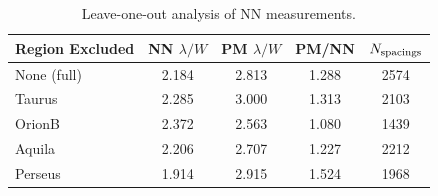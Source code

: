 \begin{table}[htbp]
\centering
\caption{Leave-one-out analysis of NN measurements.}
\label{tab:leave_one_out}
\begin{tabular}{lcccc}
\hline
Region Excluded & NN $\lambda/W$ & PM $\lambda/W$ & PM/NN & $N_{\rm spacings}$ \\
\hline
None (full) & 2.184 & 2.813 & 1.288 & 2574 \\
\hline
Taurus & 2.285 & 3.000 & 1.313 & 2103 \\
OrionB & 2.372 & 2.563 & 1.080 & 1439 \\
Aquila & 2.206 & 2.707 & 1.227 & 2212 \\
Perseus & 1.914 & 2.915 & 1.524 & 1968 \\
\hline
\end{tabular}
\end{table}